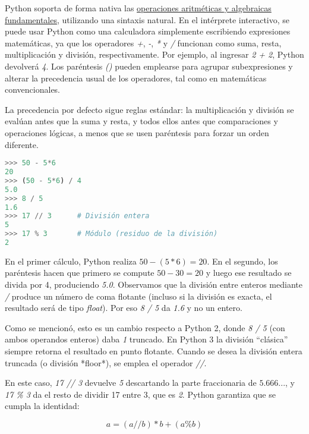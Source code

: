 Python soporta de forma nativa las 
\href{https://docs.python.org/3/tutorial/introduction.html\#using-python-as-a-calculator}{operaciones aritméticas y algebraicas fundamentales}, 
utilizando una sintaxis natural. En el intérprete interactivo, se puede usar Python como una calculadora simplemente escribiendo expresiones matemáticas, 
ya que los operadores \textit{+}, \textit{-}, \textit{*} y \textit{/} funcionan como suma, resta, multiplicación y división, respectivamente. 
Por ejemplo, al ingresar \textit{2 + 2}, Python devolverá \textit{4}. 
Los paréntesis \textit{()} pueden emplearse para agrupar subexpresiones y alterar la precedencia usual de los operadores, 
tal como en matemáticas convencionales. 


La precedencia por defecto sigue reglas estándar: la multiplicación y división se evalúan antes que la suma y resta, 
y todos ellos antes que comparaciones y operaciones lógicas, a menos que se usen paréntesis para forzar un orden diferente.

\begin{lstlisting}[language=Python, caption={Operaciones en Python.}]
>>> 50 - 5*6
20
>>> (50 - 5*6) / 4
5.0
>>> 8 / 5
1.6
>>> 17 // 3      # División entera
5
>>> 17 % 3       # Módulo (residuo de la división)
2
\end{lstlisting}

En el primer cálculo, Python realiza $50 - (5*6) = 20$. En el segundo, los paréntesis hacen que primero se compute 
$50 - 30 = 20$ y luego ese resultado se divida por 4, produciendo \textit{5.0}. 
Observamos que la división entre enteros mediante \textit{/} produce un número de coma flotante (incluso si la división es exacta, 
el resultado será de tipo \textit{float}). Por eso \textit{8 / 5} da \textit{1.6} y no un entero. 

Como se mencionó, esto es un cambio respecto a Python 2, donde \textit{8 / 5} (con ambos operandos enteros) daba \textit{1} truncado. 
En Python 3 la división “clásica” siempre retorna el resultado en punto flotante. 
Cuando se desea la división entera truncada (o división *floor*), se emplea el operador \textit{//}. 

En este caso, \textit{17 // 3} devuelve \textit{5} descartando la parte fraccionaria de $5.666...$, 
y \textit{17 \% 3} da el resto de dividir 17 entre 3, que es \textit{2}. 
Python garantiza que se cumpla la identidad:

\[
a = (a // b) * b + (a \% b)
\]

